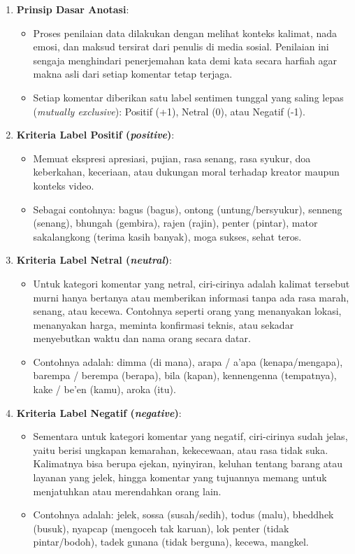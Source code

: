 \begin{enumerate}\singlespacing
    \item \textbf{Prinsip Dasar Anotasi}:
    \begin{itemize}
        \item Proses penilaian data dilakukan dengan melihat konteks kalimat, nada emosi, dan maksud tersirat dari penulis di media sosial. Penilaian ini sengaja menghindari penerjemahan kata demi kata secara harfiah agar makna asli dari setiap komentar tetap terjaga.
        \item Setiap komentar diberikan satu label sentimen tunggal yang saling lepas (\textit{mutually exclusive}): Positif (+1), Netral (0), atau Negatif (-1).
    \end{itemize}

    \item \textbf{Kriteria Label Positif (\textit{positive})}:
    \begin{itemize}
        \item Memuat ekspresi apresiasi, pujian, rasa senang, rasa syukur, doa keberkahan, keceriaan, atau dukungan moral terhadap kreator maupun konteks video.
        \item Sebagai contohnya: bagus (bagus), ontong (untung/bersyukur), senneng (senang), bhungah (gembira), rajen (rajin), penter (pintar), mator sakalangkong (terima kasih banyak), moga sukses, sehat teros.
    \end{itemize}

    \item \textbf{Kriteria Label Netral (\textit{neutral})}:
    \begin{itemize}
        \item Untuk kategori komentar yang netral, ciri-cirinya adalah kalimat tersebut murni hanya bertanya atau memberikan informasi tanpa ada rasa marah, senang, atau kecewa. Contohnya seperti orang yang menanyakan lokasi, menanyakan harga, meminta konfirmasi teknis, atau sekadar menyebutkan waktu dan nama orang secara datar.
        \item Contohnya adalah: dimma (di mana), arapa / a’apa (kenapa/mengapa), barempa / berempa (berapa), bila (kapan), kennengenna (tempatnya), kake / be’en (kamu), aroka (itu).
    \end{itemize}

    \item \textbf{Kriteria Label Negatif (\textit{negative})}:
    \begin{itemize}
        \item Sementara untuk kategori komentar yang negatif, ciri-cirinya sudah jelas, yaitu berisi ungkapan kemarahan, kekecewaan, atau rasa tidak suka. Kalimatnya bisa berupa ejekan, nyinyiran, keluhan tentang barang atau layanan yang jelek, hingga komentar yang tujuannya memang untuk menjatuhkan atau merendahkan orang lain.
        \item Contohnya adalah: jelek, sossa (susah/sedih), todus (malu), bheddhek (busuk), nyapcap (mengoceh tak karuan), lok penter (tidak pintar/bodoh), tadek gunana (tidak berguna), kecewa, mangkel.
    \end{itemize}


\end{enumerate}
